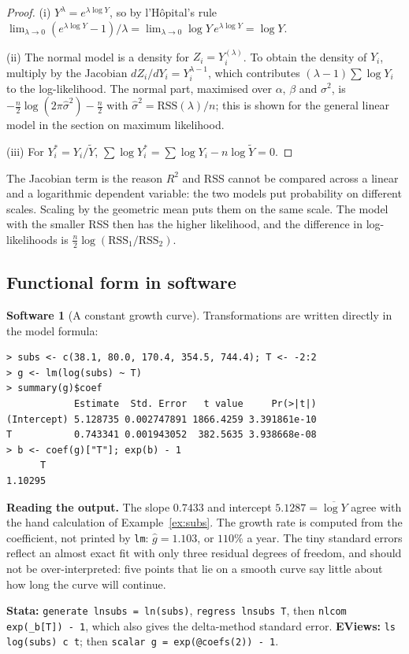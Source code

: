 \documentclass[11pt,a4paper]{article}
\numberwithin{equation}{section}
\theoremstyle{definition}
\newtheorem{software}[thm]{Software}
\begin{document}
\begin{proof}
(i) $Y^{\lambda} = e^{\lambda\log Y}$, so by l'H\^opital's rule
$\lim_{\lambda\to0}(e^{\lambda\log Y} - 1)/\lambda = \lim_{\lambda\to0}\log Y\,e^{\lambda\log Y} = \log Y$.

(ii) The normal model is a density for $Z_i = Y_i^{(\lambda)}$. To obtain the density of $Y_i$, multiply by the Jacobian
$dZ_i/dY_i = Y_i^{\lambda - 1}$, which contributes $(\lambda - 1)\sum\log Y_i$ to the log-likelihood. The normal part, maximised over $\alpha$, $\beta$
and $\sigma^2$, is $-\frac n2\log(2\pi\hat\sigma^2) - \frac n2$ with $\hat\sigma^2 = \text{RSS}(\lambda)/n$; this is shown for the general linear model in
the section on maximum likelihood.

(iii) For $Y_i^* = Y_i/\tilde Y$, $\sum\log Y_i^* = \sum\log Y_i - n\log\tilde Y = 0$.
\end{proof}

The Jacobian term is the reason $R^2$ and RSS cannot be compared across a linear and a logarithmic dependent variable: the two models put
probability on different scales. Scaling by the geometric mean puts them on the same scale. The model with the smaller RSS then has the higher
likelihood, and the difference in log-likelihoods is $\frac n2\log(\text{RSS}_1/\text{RSS}_2)$.

\subsection{Functional form in software}
\label{ssec:software3}

\begin{software}[A constant growth curve]
\label{sw:growth}
Transformations are written directly in the model formula:
{\small\begin{verbatim}
> subs <- c(38.1, 80.0, 170.4, 354.5, 744.4); T <- -2:2
> g <- lm(log(subs) ~ T)
> summary(g)$coef
            Estimate  Std. Error   t value     Pr(>|t|)
(Intercept) 5.128735 0.002747891 1866.4259 3.391861e-10
T           0.743341 0.001943052  382.5635 3.938668e-08
> b <- coef(g)["T"]; exp(b) - 1
      T
1.10295
\end{verbatim}}
\textbf{Reading the output.} The slope $0.7433$ and intercept $5.1287 = \overline{\log Y}$ agree with the hand calculation of
Example~\ref{ex:subs}. The growth rate is computed from the coefficient, not printed by \texttt{lm}: $\hat g = 1.103$, or $110\%$ a year. The tiny
standard errors reflect an almost exact fit with only three residual degrees of freedom, and should not be over-interpreted: five points that lie
on a smooth curve say little about how long the curve will continue.

\textbf{Stata:} \texttt{generate lnsubs = ln(subs)}, \texttt{regress lnsubs T}, then \texttt{nlcom exp(\_b[T]) - 1}, which also gives the
delta-method standard error. \textbf{EViews:} \texttt{ls log(subs) c t}; then \texttt{scalar g = exp(@coefs(2)) - 1}.
\end{software}
\end{document}
